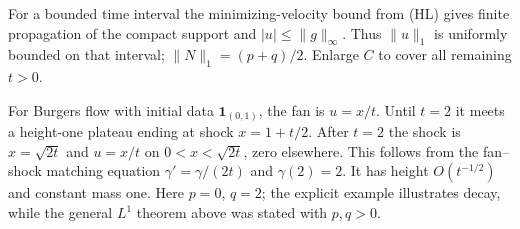 \begin{expandedproof}
For a bounded time interval the minimizing-velocity bound from (HL)
gives finite propagation of the compact support and $|u|\leq\|g\|_\infty$.
Thus $\|u\|_1$ is uniformly bounded on that interval; $\|N\|_1=(p+q)/2$.
Enlarge $C$ to cover all remaining $t>0$.
\end{expandedproof}
\Needspace{45mm}

For Burgers flow with initial data $\mathbf1_{(0,1)}$, the fan is $u=x/t$.
Until $t=2$ it meets a height-one plateau ending at shock $x=1+t/2$.
After $t=2$ the shock is $x=\sqrt{2t}$ and
$u=x/t$ on $0<x<\sqrt{2t}$, zero elsewhere.
This follows from the fan--shock matching equation
$\gamma'=\gamma/(2t)$ and $\gamma(2)=2$.
It has height $O(t^{-1/2})$ and constant mass one.
Here $p=0$, $q=2$; the explicit example illustrates decay, while
the general $L^1$ theorem above was stated with $p,q>0$.
